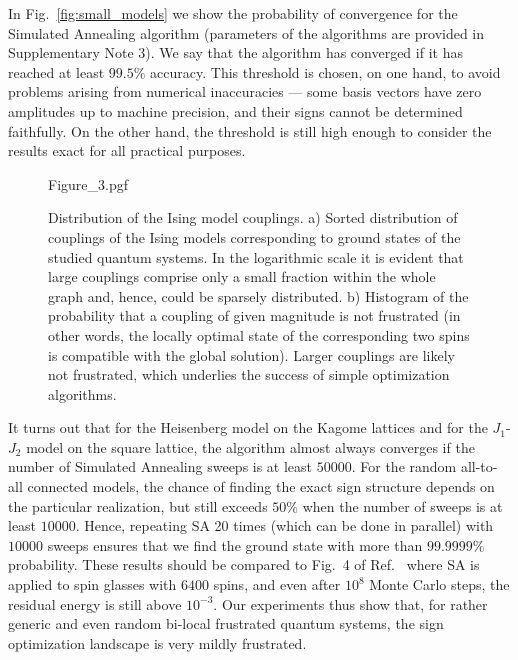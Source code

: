 In Fig.~\ref{fig:small_models} we show the probability of convergence for the Simulated Annealing algorithm (parameters of the algorithms are provided in Supplementary Note 3). We say that the algorithm has converged if it has reached at least $99.5\%$ accuracy. This threshold is chosen, on one hand, to avoid problems arising from numerical inaccuracies --- some basis vectors have zero amplitudes up to machine precision, and their signs cannot be determined faithfully. On the other hand, the threshold is still high enough to consider the results exact for all practical purposes.

\begin{figure}
    \centering
    {Figure_3.pgf}%
    \caption{Distribution of the Ising model couplings. a) Sorted distribution of couplings of the Ising models corresponding to ground states of the studied quantum systems. In the logarithmic scale it is evident that large couplings comprise only a small fraction within the whole graph and, hence, could be sparsely distributed. b) Histogram of the probability that a coupling of given magnitude is not frustrated (in other words, the locally optimal state of the corresponding two spins is compatible with the global solution). Larger couplings are likely not frustrated, which underlies the success of simple optimization algorithms.}
    \label{fig:coupling_distribution}
\end{figure}

It turns out that for the Heisenberg model on the Kagome lattices and for the $J_1$-$J_2$ model on the square lattice, the algorithm almost always converges if the number of Simulated Annealing sweeps is at least $50000$. For the random all-to-all connected models, the chance of finding the exact sign structure depends on the particular realization, but still exceeds $50\%$ when the number of sweeps is at least $10000$. Hence, repeating SA 20 times (which can be done in parallel) with $10000$ sweeps ensures that we find the ground state with more than $99.9999\%$ probability. These results should be compared to Fig.~4 of Ref.~\cite{heim2015quantum} where SA is applied to spin glasses with $6400$ spins, and even after $10^8$ Monte Carlo steps, the residual energy is still above $10^{-3}$. Our experiments thus show that, for rather generic and even random bi-local frustrated quantum systems, the sign optimization landscape is very mildly frustrated.

